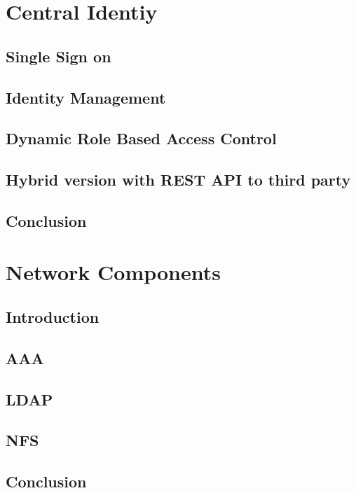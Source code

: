 \documentclass[12pt]{report}
\begin{document}
\chapter{Central Identiy}

\section{Single Sign on}

\section{Identity Management}

\section{Dynamic Role Based Access Control}

\section{Hybrid version with REST API to third party }

\section{Conclusion}

\chapter{Network Components}

\section{Introduction}

\section{AAA}

\section{LDAP}

\section{NFS}

\section{Conclusion}
\end{document}
